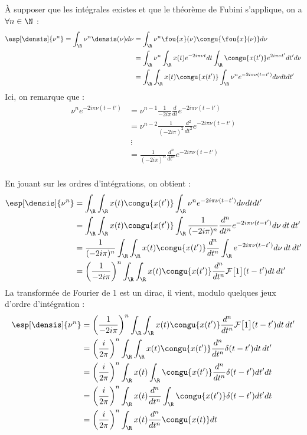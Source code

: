 \begin{annexe}
\begin{demo}
	\`A supposer que les intégrales existes et que le théorème de Fubini s'applique, on a $\forall n\in\N$ :
	\begin{align*}
		\esp[\densis]{\nu^n} = \int_\R \nu^n\densis(\nu) d\nu &= \int_\R \nu^n \fou{x}(\nu)\congu{\fou{x}(\nu)} d\nu \\
		&= \int_\R \nu^n \int_\R x(t)e^{-2i \pi \nu t} dt \int_\R \congu{x(t')}e^{2i \pi \nu t'} dt' d\nu \\
		&= \int_\R \int_\R x(t) \congu{x(t')} \int_\R \nu^n e^{-2i \pi \nu (t-t')} d\nu dt dt' 
	\end{align*}
	Ici, on remarque que :
	\begin{align*}
		\nu^n e^{-2i \pi \nu (t-t')} &= \nu^{n-1}\frac{1}{-2i \pi}\frac{d}{dt}e^{-2i \pi \nu(t-t')} \\
		&= \nu^{n-2}\frac{1}{(-2i \pi)^2}\frac{d^2}{dt^2}e^{-2i \pi \nu(t-t')} \\
		&\ \vdots \\
		&= \frac{1}{(-2i \pi)^n}\frac{d^n}{dt^n}e^{-2i \pi \nu(t-t')}
	\end{align*}
	\\
	
	En jouant sur les ordres d'intégrations, on obtient :
	\begin{align*}
		\esp[\densis]{\nu^n} &= \int_\R \int_\R x(t) \congu{x(t')} \int_\R \nu^n e^{-2i \pi \nu (t-t')} d\nu dt dt'  \\
		&= \int_\R \int_\R x(t) \congu{x(t')} \int_\R \frac{1}{(-2i \pi)^n}\frac{d^n}{dt^n}e^{-2i \pi \nu(t-t')} d\nu\, dt\, dt' \\
		&= \frac{1}{(-2i \pi)^n} \int_\R \int_\R x(t) \congu{x(t')} \frac{d^n}{dt^n}\int_\R e^{-2i \pi \nu(t-t')} d\nu\, dt\, dt' \\
		&= \left(\frac{1}{-2i \pi}\right)^n \int_\R \int_\R x(t) \congu{x(t')} \frac{d^n}{dt^n}\mathcal{F}\big[1\big](t-t') dt\, dt'
	\end{align*}
	La transformée de Fourier de 1 est un dirac, il vient, modulo quelques jeux d'ordre d'intégration :
	\begin{align*}
		\esp[\densis]{\nu^n} &= \left(\frac{1}{-2i \pi}\right)^n \int_\R \int_\R x(t) \congu{x(t')} \frac{d^n}{dt^n}\mathcal{F}\big[1\big](t-t') dt\, dt' \\
		&= \left(\frac{i}{2 \pi}\right)^n \int_\R \int_\R x(t) \congu{x(t')} \frac{d^n}{dt^n}\delta(t-t') dt\, dt' \\
		&= \left(\frac{i}{2 \pi}\right)^n \int_\R x(t) \int_\R \congu{x(t')} \frac{d^n}{dt^n}\delta(t-t') dt' dt \\
		&= \left(\frac{i}{2 \pi}\right)^n \int_\R x(t) \frac{d^n}{dt^n} \int_\R \congu{x(t')} \delta(t-t') dt' dt \\
		&= \left(\frac{i}{2 \pi}\right)^n  \int_\R x(t) \frac{d^n}{dt^n}  \congu{x(t)} dt
	\end{align*}
\end{demo}
	

\end{annexe}
